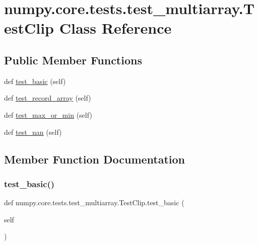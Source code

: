 \hypertarget{classnumpy_1_1core_1_1tests_1_1test__multiarray_1_1TestClip}{}\section{numpy.\+core.\+tests.\+test\+\_\+multiarray.\+Test\+Clip Class Reference}
\label{classnumpy_1_1core_1_1tests_1_1test__multiarray_1_1TestClip}
\subsection*{Public Member Functions}
\begin{DoxyCompactItemize}
\item 
def \hyperlink{classnumpy_1_1core_1_1tests_1_1test__multiarray_1_1TestClip_ad11196a72b0c542e6b16ac120c7af4c7}{test\+\_\+basic} (self)
\item 
def \hyperlink{classnumpy_1_1core_1_1tests_1_1test__multiarray_1_1TestClip_a19039ff0a4e88c1d29432c01ed097301}{test\+\_\+record\+\_\+array} (self)
\item 
def \hyperlink{classnumpy_1_1core_1_1tests_1_1test__multiarray_1_1TestClip_ac6c2ee2e14d700ec38def9b6059e28e2}{test\+\_\+max\+\_\+or\+\_\+min} (self)
\item 
def \hyperlink{classnumpy_1_1core_1_1tests_1_1test__multiarray_1_1TestClip_ae04d53dbdfd2922fed5ca40f867a97b9}{test\+\_\+nan} (self)
\end{DoxyCompactItemize}


\subsection{Member Function Documentation}
\mbox{\label{classnumpy_1_1core_1_1tests_1_1test__multiarray_1_1TestClip_ad11196a72b0c542e6b16ac120c7af4c7}} 
\subsubsection{\texorpdfstring{test\+\_\+basic()}{test\_basic()}}
{\footnotesize\ttfamily def numpy.\+core.\+tests.\+test\+\_\+multiarray.\+Test\+Clip.\+test\+\_\+basic (\begin{DoxyParamCaption}\item[{}]{self }\end{DoxyParamCaption})}

